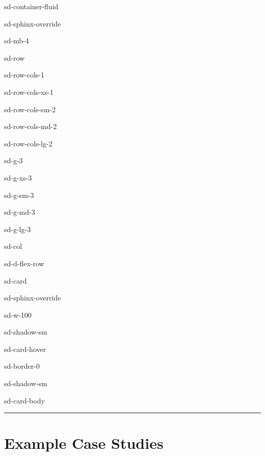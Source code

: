 \documentclass[a4paper,10pt,english]{sphinxmanual}
\begin{document}
\begin{sphinxuseclass}{sd-container-fluid}
\begin{sphinxuseclass}{sd-sphinx-override}
\begin{sphinxuseclass}{sd-mb-4}
\begin{sphinxuseclass}{sd-row}
\begin{sphinxuseclass}{sd-row-cols-1}
\begin{sphinxuseclass}{sd-row-cols-xs-1}
\begin{sphinxuseclass}{sd-row-cols-sm-2}
\begin{sphinxuseclass}{sd-row-cols-md-2}
\begin{sphinxuseclass}{sd-row-cols-lg-2}
\begin{sphinxuseclass}{sd-g-3}
\begin{sphinxuseclass}{sd-g-xs-3}
\begin{sphinxuseclass}{sd-g-sm-3}
\begin{sphinxuseclass}{sd-g-md-3}
\begin{sphinxuseclass}{sd-g-lg-3}
\begin{sphinxuseclass}{sd-col}
\begin{sphinxuseclass}{sd-d-flex-row}
\begin{sphinxuseclass}{sd-card}
\begin{sphinxuseclass}{sd-sphinx-override}
\begin{sphinxuseclass}{sd-w-100}
\begin{sphinxuseclass}{sd-shadow-sm}
\begin{sphinxuseclass}{sd-card-hover}
\begin{sphinxuseclass}{sd-border-0}
\begin{sphinxuseclass}{sd-shadow-sm}
\begin{sphinxuseclass}{sd-card-body}
\end{sphinxuseclass}{\hyperref[\detokenize{getting-started/gpu::doc}]{}}
\end{sphinxuseclass}
\end{sphinxuseclass}
\end{sphinxuseclass}
\end{sphinxuseclass}
\end{sphinxuseclass}
\end{sphinxuseclass}
\end{sphinxuseclass}
\end{sphinxuseclass}
\end{sphinxuseclass}
\end{sphinxuseclass}
\end{sphinxuseclass}
\end{sphinxuseclass}
\end{sphinxuseclass}
\end{sphinxuseclass}
\end{sphinxuseclass}
\end{sphinxuseclass}
\end{sphinxuseclass}
\end{sphinxuseclass}
\end{sphinxuseclass}
\end{sphinxuseclass}
\end{sphinxuseclass}
\end{sphinxuseclass}
\end{sphinxuseclass}

\bigskip\hrule\bigskip



\chapter{Example Case Studies}
\label{\detokenize{index:example-case-studies}}
\end{document}
